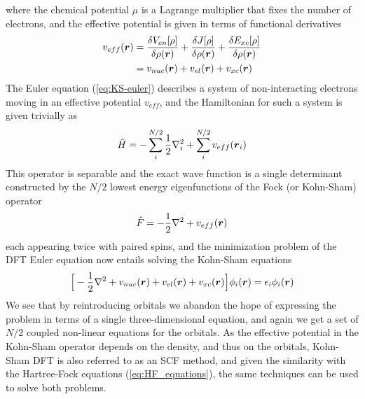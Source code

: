 where the chemical potential $\mu$ is a Lagrange multiplier that fixes the number of 
electrons, and the effective potential is given in terms of functional derivatives
\begin{align}
    v_{eff}(\boldsymbol r) 
	&= \frac{\delta V_{en}[\rho]}{\delta \rho(\boldsymbol r)}
	+ \frac{\delta J[\rho]}{\delta \rho(\boldsymbol r)}
	+ \frac{\delta E_{xc}[\rho]}{\delta \rho(\boldsymbol r)}\\
	\label{eq:effective_pot}
	&= v_{nuc}(\boldsymbol r) + v_{el}(\boldsymbol r) + v_{xc}(\boldsymbol r)
\end{align}
The Euler equation (\ref{eq:KS-euler}) describes a system of non-interacting electrons 
moving in an effective potential $v_{eff}$, and the Hamiltonian for such a system is given 
trivially as
\begin{equation}
    \hat{H} = -\sum_i^{N/2} \frac{1}{2}\nabla_i^2 + \sum_i^{N/2} v_{eff}(\boldsymbol r_i)
\end{equation}
This operator is separable and the exact wave function is a single determinant constructed 
by the $N/2$ lowest energy eigenfunctions of the Fock (or Kohn-Sham) operator
\begin{equation}
    \hat{F} = -\frac{1}{2}\nabla^2 + v_{eff}(\boldsymbol r)
\end{equation}
each appearing twice with paired spins, and the minimization problem of the DFT Euler equation 
now entails solving the Kohn-Sham equations
\begin{equation}
    \label{eq:KS_equations}
    \Big[-\frac{1}{2}\nabla^2 + v_{nuc}(\boldsymbol r) + v_{el}(\boldsymbol r) + v_{xc}(\boldsymbol r)\Big] 
	\phi_i(\boldsymbol r) = \epsilon_i \phi_i(\boldsymbol r)
\end{equation}
We see that by reintroducing orbitals we abandon the hope of expressing the problem in terms 
of a single three-dimensional equation, and again we get a set of $N/2$ coupled non-linear 
equations for the orbitals. As the effective potential in the Kohn-Sham operator depends on 
the density, and thus on the orbitals, Kohn-Sham DFT is also referred to as an SCF method, 
and given the similarity with the Hartree-Fock equations (\ref{eq:HF_equations}), the same 
techniques can be used to solve both problems. 

